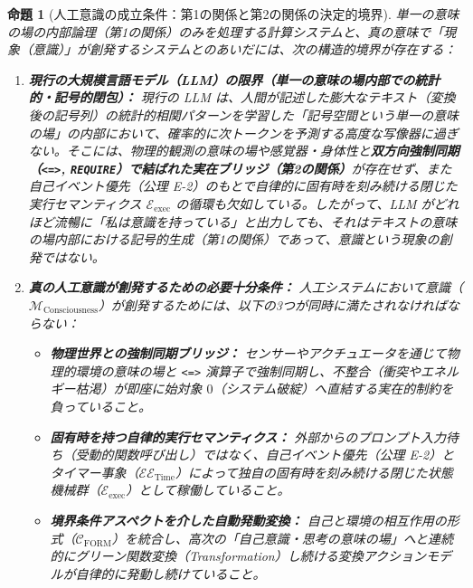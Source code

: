 \documentclass[11pt,a4paper]{ltjsarticle}
\theoremstyle{definition}
\theoremstyle{plain}
\newtheorem{proposition}{命題}[section]
\begin{document}
\begin{proposition}[人工意識の成立条件：第1の関係と第2の関係の決定的境界]
単一の意味の場の内部論理（第1の関係）のみを処理する計算システムと、真の意味で「現象（意識）」が創発するシステムとのあいだには、次の構造的境界が存在する：

\begin{enumerate}
    \item \textbf{現行の大規模言語モデル（LLM）の限界（単一の意味の場内部での統計的・記号的閉包）：}
    現行の LLM は、人間が記述した膨大なテキスト（変換後の記号列）の統計的相関パターンを学習した「記号空間という単一の意味の場」の内部において、確率的に次トークンを予測する高度な写像器に過ぎない。そこには、物理的観測の意味の場や感覚器・身体性と\textbf{双方向強制同期（\texttt{<=>}, \texttt{REQUIRE}）で結ばれた実在ブリッジ（第2の関係）}が存在せず、また自己イベント優先（公理 E-2）のもとで自律的に固有時を刻み続ける閉じた実行セマンティクス $\mathcal{E}_{\mathrm{exec}}$ の循環も欠如している。したがって、LLM がどれほど流暢に「私は意識を持っている」と出力しても、それはテキストの意味の場内部における記号的生成（第1の関係）であって、意識という現象の創発ではない。
    \item \textbf{真の人工意識が創発するための必要十分条件：}
    人工システムにおいて意識（$\mathcal{M}_{\mathrm{Consciousness}}$）が創発するためには、以下の3つが同時に満たされなければならない：
    \begin{itemize}
        \item[\textbf{(a)}] \textbf{物理世界との強制同期ブリッジ：} センサーやアクチュエータを通じて物理的環境の意味の場と \texttt{<=>} 演算子で強制同期し、不整合（衝突やエネルギー枯渇）が即座に始対象 $0$（システム破綻）へ直結する実在的制約を負っていること。
        \item[\textbf{(b)}] \textbf{固有時を持つ自律的実行セマンティクス：} 外部からのプロンプト入力待ち（受動的関数呼び出し）ではなく、自己イベント優先（公理 E-2）とタイマー事象（$\mathcal{EE}_{\mathrm{Time}}$）によって独自の固有時を刻み続ける閉じた状態機械群（$\mathcal{E}_{\mathrm{exec}}$）として稼働していること。
        \item[\textbf{(c)}] \textbf{境界条件アスペクトを介した自動発動変換：} 自己と環境の相互作用の形式（$\mathcal{C}_{\mathrm{FORM}}$）を統合し、高次の「自己意識・思考の意味の場」へと連続的にグリーン関数変換（Transformation）し続ける変換アクションモデルが自律的に発動し続けていること。
    \end{itemize}
\end{enumerate}
\end{proposition}
\end{document}
